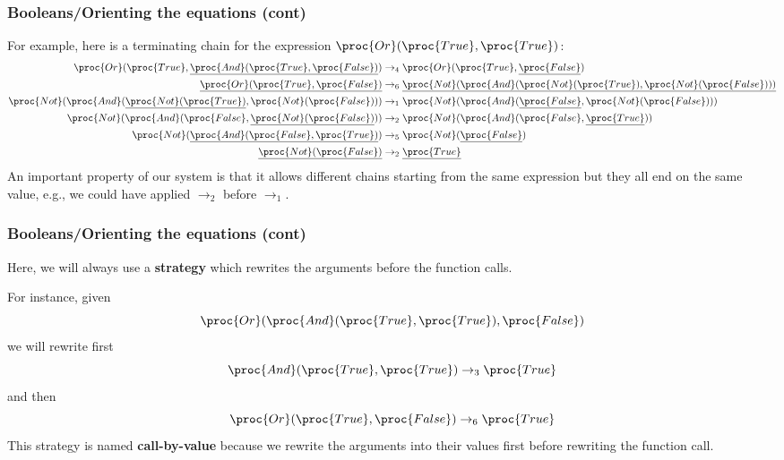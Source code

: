 %
\begin{frame}
\frametitle{Booleans/Orienting the equations (cont)}

\noindent For example, here is a terminating chain for the expression
\(\proc{Or} (\proc{True}, \proc{True})\): {\footnotesize
\begin{align*}
\proc{Or} (\proc{True}, \underline{\proc{And} (\proc{True}, \proc{False})})
&\rightarrow_4 \proc{Or} (\proc{True}, \underline{\proc{False}})\\
  \underline{\proc{Or} (\proc{True}, \proc{False})}
&\rightarrow_6 \underline{\proc{Not} (\proc{And} (\proc{Not}
  (\proc{True}), \proc{Not} (\proc{False})))}\\
  \proc{Not} (\proc{And} (\underline{\proc{Not} (\proc{True})},
  \proc{Not} (\proc{False})))
&\rightarrow_1 \proc{Not} (\proc{And} (\underline{\proc{False}},
  \proc{Not} (\proc{False})))\\
  \proc{Not} (\proc{And} (\proc{False}, \underline{\proc{Not}
  (\proc{False})}))
&\rightarrow_2 \proc{Not} (\proc{And} (\proc{False},
  \underline{\proc{True}}))\\
  \proc{Not} (\underline{\proc{And} (\proc{False}, \proc{True})})
&\rightarrow_5 \proc{Not} (\underline{\proc{False}})\\
  \underline{\proc{Not} (\proc{False})}
&\rightarrow_2 \underline{\proc{True}}
\end{align*}
}
An important property of our system is that it allows different chains
starting from the same expression but they all end on the same value,
e.g., we could have applied \(\rightarrow_2\) before \(\rightarrow_1\).

\end{frame}

%
\begin{frame}
\frametitle{Booleans/Orienting the equations (cont)}

Here, we will always use a \textbf{strategy} which rewrites the
arguments before the function calls.

\bigskip

For instance, given
\[
\proc{Or} (\proc{And} (\proc{True}, \proc{True}), \proc{False})
\]
we will rewrite first
\[
\proc{And} (\proc{True}, \proc{True}) \rightarrow_3 \proc{True}
\]
and then
\[
\proc{Or} (\proc{True}, \proc{False}) \rightarrow_6 \proc{True}
\]
This strategy is named \textbf{call-by-value} because we rewrite the
arguments into their values first before rewriting the function call.

\end{frame}
